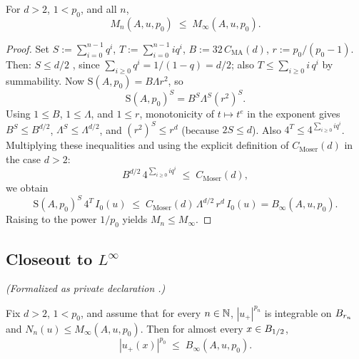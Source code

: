 \begin{lemma}
\label{lem:moser-geom-maj}
\leanok
{}
For $d > 2$, $1 < p_0$, and all $n$,
\begin{equation*}
  M_n(A,u,p_0) \;\leq\; M_\infty(A,u,p_0).
\end{equation*}
\end{lemma}

\begin{proof}
\leanok
{}

Set $S := \sum_{i=0}^{n-1} q^{i}$, $T := \sum_{i=0}^{n-1} i q^{i}$,
$B := 32\,C_{\mathrm{MA}}(d)$, $r := p_0/(p_0-1)$. Then:
$S \leq d/2$ , since
$\sum_{i\geq 0} q^{i} = 1/(1-q) = d/2$; also $T \leq \sum_{i\geq 0} i\,q^{i}$
 by summability.
Now $\mathrm{S}(A,p_0) = B \Lambda r^{2}$, so
\begin{equation*}
  \mathrm{S}(A,p_0)^{S}
  = B^{S} \Lambda^{S} (r^{2})^{S}.
\end{equation*}
Using $1 \leq B$, $1 \leq \Lambda$, and $1 \leq r$, monotonicity of $t \mapsto
t^{e}$ in the exponent gives $B^{S} \leq B^{d/2}$, $\Lambda^{S} \leq
\Lambda^{d/2}$, and $(r^{2})^{S} \leq r^{d}$ (because $2S \leq d$). Also $4^{T}
\leq 4^{\sum_{i\geq 0} i q^{i}}$. Multiplying these inequalities and using the
explicit definition of $C_{\mathrm{Moser}}(d)$ in the case $d>2$:
\begin{equation*}
  B^{d/2}\,4^{\sum_{i\geq 0} i q^{i}} \;\leq\; C_{\mathrm{Moser}}(d),
\end{equation*}
we obtain
\begin{equation*}
  \mathrm{S}(A,p_0)^{S}\,4^{T}\,I_0(u)
  \;\leq\;
  C_{\mathrm{Moser}}(d)\,\Lambda^{d/2}\,r^{d}\,I_0(u)
  = B_\infty(A,u,p_0).
\end{equation*}
Raising to the power $1/p_0$ yields $M_n \leq M_\infty$.
\end{proof}

\subsection{Closeout to $L^\infty$}

\begin{lemma}
\label{lem:moser-closeout}
\leanok
{}
\noindent\textit{(Formalized as private declaration .)}\par
Fix $d > 2$, $1 < p_0$, and assume that for every $n \in \mathbb{N}$,
$|u_+|^{p_n}$ is integrable on $B_{r_n}$ and $N_n(u) \leq M_\infty(A,u,p_0)$.
Then for almost every $x \in B_{1/2}$,
\begin{equation*}
  |u_+(x)|^{p_0} \;\leq\; B_\infty(A,u,p_0).
\end{equation*}
\end{lemma}

